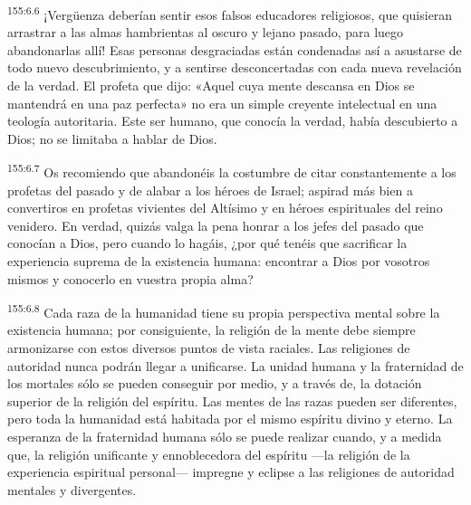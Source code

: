 \par 
\textsuperscript{155:6.6} ¡Verg\"uenza deberían sentir esos falsos educadores religiosos, que quisieran arrastrar a las almas hambrientas al oscuro y lejano pasado, para luego abandonarlas allí! Esas personas desgraciadas están condenadas así a asustarse de todo nuevo descubrimiento, y a sentirse desconcertadas con cada nueva revelación de la verdad. El profeta que dijo: «Aquel cuya mente descansa en Dios se mantendrá en una paz perfecta» no era un simple creyente intelectual en una teología autoritaria. Este ser humano, que conocía la verdad, había descubierto a Dios; no se limitaba a hablar de Dios.

\par 
\textsuperscript{155:6.7} Os recomiendo que abandonéis la costumbre de citar constantemente a los profetas del pasado y de alabar a los héroes de Israel; aspirad más bien a convertiros en profetas vivientes del Altísimo y en héroes espirituales del reino venidero. En verdad, quizás valga la pena honrar a los jefes del pasado que conocían a Dios, pero cuando lo hagáis, ¿por qué tenéis que sacrificar la experiencia suprema de la existencia humana: encontrar a Dios por vosotros mismos y conocerlo en vuestra propia alma?

\par 
\textsuperscript{155:6.8} Cada raza de la humanidad tiene su propia perspectiva mental sobre la existencia humana; por consiguiente, la religión de la mente debe siempre armonizarse con estos diversos puntos de vista raciales. Las religiones de autoridad nunca podrán llegar a unificarse. La unidad humana y la fraternidad de los mortales sólo se pueden conseguir por medio, y a través de, la dotación superior de la religión del espíritu. Las mentes de las razas pueden ser diferentes, pero toda la humanidad está habitada por el mismo espíritu divino y eterno. La esperanza de la fraternidad humana sólo se puede realizar cuando, y a medida que, la religión unificante y ennoblecedora del espíritu ---la religión de la experiencia espiritual personal--- impregne y eclipse a las religiones de autoridad mentales y divergentes.

